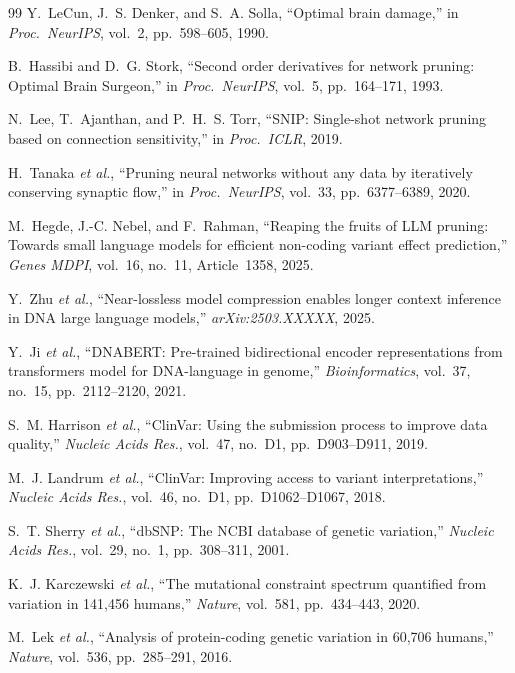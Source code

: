 \documentclass[journal]{IEEEtran}
\begin{document}
\begin{thebibliography}{99}
Y.~LeCun, J.~S. Denker, and S.~A. Solla,
``Optimal brain damage,''
in \textit{Proc.\ NeurIPS}, vol.~2, pp.~598--605, 1990.

B.~Hassibi and D.~G. Stork,
``Second order derivatives for network pruning: Optimal Brain
Surgeon,''
in \textit{Proc.\ NeurIPS}, vol.~5, pp.~164--171, 1993.

N.~Lee, T.~Ajanthan, and P.~H.~S. Torr,
``SNIP: Single-shot network pruning based on connection
sensitivity,''
in \textit{Proc.\ ICLR}, 2019.

H.~Tanaka \textit{et al.},
``Pruning neural networks without any data by iteratively
conserving synaptic flow,''
in \textit{Proc.\ NeurIPS}, vol.~33, pp.~6377--6389, 2020.

M.~Hegde, J.-C. Nebel, and F.~Rahman,
``Reaping the fruits of LLM pruning: Towards small language
models for efficient non-coding variant effect prediction,''
\textit{Genes MDPI}, vol.~16, no.~11, Article~1358, 2025.

Y.~Zhu \textit{et al.},
``Near-lossless model compression enables longer context
inference in DNA large language models,''
\textit{arXiv:2503.XXXXX}, 2025.

Y.~Ji \textit{et al.},
``DNABERT: Pre-trained bidirectional encoder representations
from transformers model for DNA-language in genome,''
\textit{Bioinformatics}, vol.~37, no.~15, pp.~2112--2120, 2021.

S.~M. Harrison \textit{et al.},
``ClinVar: Using the submission process to improve data quality,''
\textit{Nucleic Acids Res.}, vol.~47, no.~D1,
pp.~D903--D911, 2019.

M.~J. Landrum \textit{et al.},
``ClinVar: Improving access to variant interpretations,''
\textit{Nucleic Acids Res.}, vol.~46, no.~D1,
pp.~D1062--D1067, 2018.

S.~T. Sherry \textit{et al.},
``dbSNP: The NCBI database of genetic variation,''
\textit{Nucleic Acids Res.}, vol.~29, no.~1,
pp.~308--311, 2001.

K.~J. Karczewski \textit{et al.},
``The mutational constraint spectrum quantified from variation
in 141,456 humans,''
\textit{Nature}, vol.~581, pp.~434--443, 2020.

M.~Lek \textit{et al.},
``Analysis of protein-coding genetic variation in 60,706
humans,''
\textit{Nature}, vol.~536, pp.~285--291, 2016.


\end{thebibliography}
\end{document}
